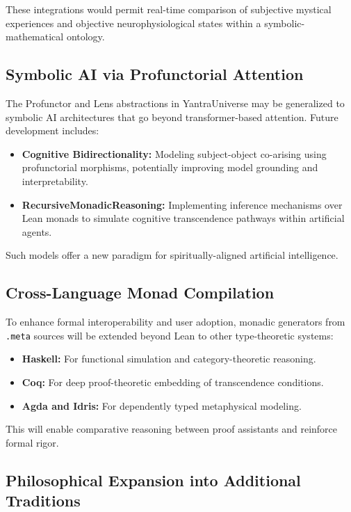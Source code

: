 \documentclass[12pt]{article}
\theoremstyle{plain}
\begin{document}
These integrations would permit real-time comparison of subjective mystical experiences and objective neurophysiological states within a symbolic-mathematical ontology.

\subsection{Symbolic AI via Profunctorial Attention}

The Profunctor and Lens abstractions in YantraUniverse may be generalized to symbolic AI architectures that go beyond transformer-based attention. Future development includes:

\begin{itemize}
  \item \textbf{Cognitive Bidirectionality:} Modeling subject-object co-arising using profunctorial morphisms, potentially improving model grounding and interpretability.
  \item \textbf{RecursiveMonadicReasoning:} Implementing inference mechanisms over Lean monads to simulate cognitive transcendence pathways within artificial agents.
\end{itemize}

Such models offer a new paradigm for spiritually-aligned artificial intelligence.

\subsection{Cross-Language Monad Compilation}

To enhance formal interoperability and user adoption, monadic generators from \texttt{.meta} sources will be extended beyond Lean to other type-theoretic systems:

\begin{itemize}
  \item \textbf{Haskell:} For functional simulation and category-theoretic reasoning.
  \item \textbf{Coq:} For deep proof-theoretic embedding of transcendence conditions.
  \item \textbf{Agda and Idris:} For dependently typed metaphysical modeling.
\end{itemize}

This will enable comparative reasoning between proof assistants and reinforce formal rigor.

\subsection{Philosophical Expansion into Additional Traditions}
\end{document}
